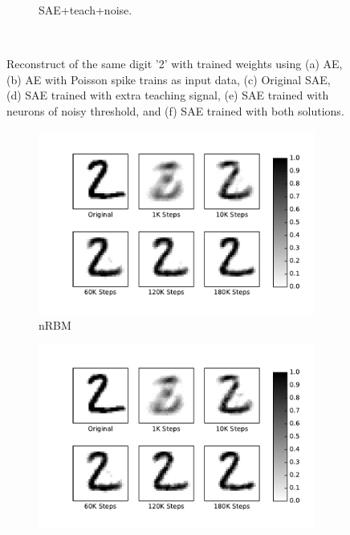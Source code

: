\begin{figure}
\begin{subfigure}[t]{0.32\textwidth}
		\caption{SAE+teach+noise.}
	\end{subfigure}\\
	\caption{Reconstruct of the same digit '2' with trained weights using (a) AE, (b) AE with Poisson spike trains as input data, (c) Original SAE, (d) SAE trained with extra teaching signal, (e) SAE trained with neurons of noisy threshold, and (f) SAE trained with both solutions.}
\end{figure}

\begin{figure}
	\centering
	\begin{subfigure}[t]{0.32\textwidth}
		\includegraphics[width=\textwidth]{pics_sdlm/32_MNIST_RBM/recon_digit.pdf}
		\caption{nRBM}
	\end{subfigure}
	\begin{subfigure}[t]{0.32\textwidth}
		\includegraphics[width=\textwidth]{pics_sdlm/33_MNIST_RBM_noise/recon_digit.pdf}

\end{subfigure}
\end{figure}
